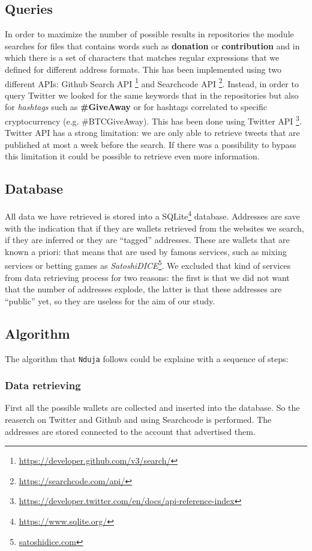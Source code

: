 \subsection{Queries} 
\label{sec:queries}
In order to maximize the number of possible results in repositories the module
\walletcollector{} searches for files that contains words such as
\textbf{donation} or \textbf{contribution} and in which there is a set of
characters that matches regular expressions that we defined for different
address formats. This has been implemented using two different APIs: Github
Search API \footnote{\url{https://developer.github.com/v3/search/}} and
Searchcode API \footnote{\url{https://searchcode.com/api/}}.
Instead, in order to query Twitter we looked for the same keywords that in the
repositories but also for \textit{hashtags} such as \textbf{\#GiveAway} or for
hashtags correlated to specific cryptocurrency (e.g. \#BTCGiveAway). This has
been done using Twitter API
\footnote{\url{https://developer.twitter.com/en/docs/api-reference-index}}.
Twitter API has a strong limitation: we are only able to retrieve tweets that
are published at most a week before the search. If there was a possibility to
bypass this limitation it could be possible to retrieve even more information.

\subsection{Database}
All data we have retrieved is stored into a
SQLite\footnote{\url{https://www.sqlite.org/}} database. Addresses are save with
the indication that if they are wallets retrieved from the websites we search,
if they are inferred or they are ``tagged'' addresses. These are wallets that
are known a priori: that means that are used by famous services, such as mixing
services or betting games as
\textit{SatoshiDICE}\footnote{\url{satoshidice.com}}. We excluded that kind of
services from data retrieving process for two reasons: the first is that we did
not want that the number of addresses explode, the latter is that these
addresses are ``public'' yet, so they are useless for the aim of our study.

\subsection{Algorithm}
The algorithm that \texttt{Nduja} follows could be explaine with a sequence of
steps:
\subsubsection*{Data retrieving} First all the possible wallets are collected
and inserted into the database. So the reaserch on Twitter and Github and using
Searchcode is performed. The addresses are stored connected to the account that
advertised them.
